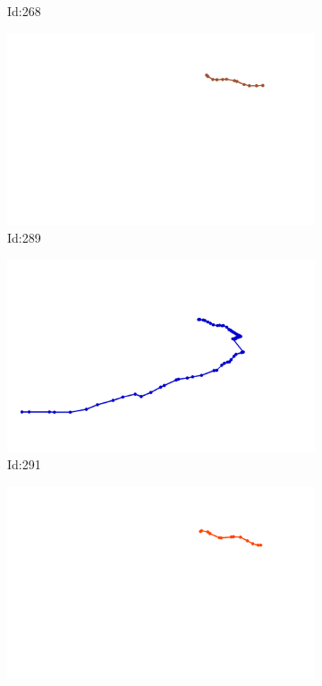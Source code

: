 \documentclass[12pt,twoside]{report}
\begin{document}
\begin{figure}
\begin{subfigure}[b]{0.20\textwidth}
\caption{Id:268}
\end{subfigure}
\begin{subfigure}[b]{0.20\textwidth}
\centering
\includegraphics[width=\textwidth]{../trajectories/289.png}
\caption{Id:289}
\end{subfigure}
\begin{subfigure}[b]{0.20\textwidth}
\centering
\includegraphics[width=\textwidth]{../trajectories/291.png}
\caption{Id:291}
\end{subfigure}
\begin{subfigure}[b]{0.20\textwidth}
\centering
\includegraphics[width=\textwidth]{../trajectories/293.png}

\end{subfigure}
\end{figure}
\end{document}
